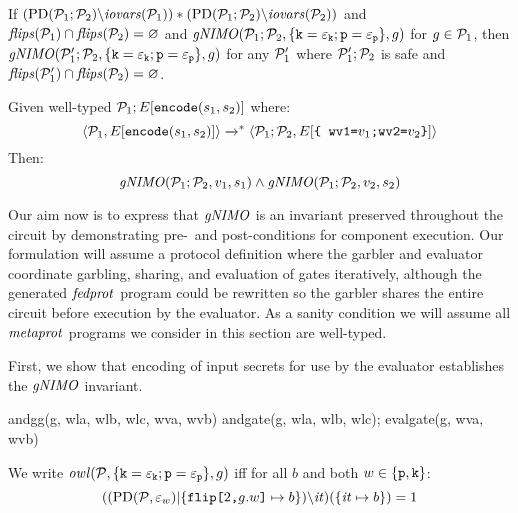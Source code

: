 \begin{lemma}
  \label{lemma-gnimo}
  If $(\mathrm{PD}(\mathcal{P}_1;\mathcal{P}_2)\backslash\mathit{iovars}(\mathcal{P}_1)) * (\mathrm{PD}(\mathcal{P}_1;\mathcal{P}_2)\backslash\mathit{iovars}(\mathcal{P}_2))$
  and $\mathit{flips}(\mathcal{P}_1) \cap \mathit{flips}(\mathcal{P}_2) = \varnothing$ and
  $\mathit{gNIMO}(\mathcal{P}_1;\mathcal{P}_2,\{ \texttt{k} = \varepsilon_{\texttt{k}}; \texttt{p} = \varepsilon_{\texttt{p}}\}, g)$ for
  $g \in \mathcal{P}_1$,
  then $\mathit{gNIMO}(\mathcal{P}_1';\mathcal{P}_2,\{ \texttt{k} = \varepsilon_{\texttt{k}}; \texttt{p} = \varepsilon_{\texttt{p}}\}, g)$
  for any $\mathcal{P}_1'$ where $\mathcal{P}_1';\mathcal{P}_2$ is safe and
  $\mathit{flips}(\mathcal{P}_1') \cap \mathit{flips}(\mathcal{P}_2) = \varnothing$.
\end{lemma}

\begin{lemma}
  Given well-typed $\mathcal{P}_1;E[\texttt{encode}(s_1,s_2)]$ where:
  $$
  \langle \mathcal{P}_1,E[\texttt{encode}(s_1,s_2)] \rangle \xrightarrow{}^{*}
  \langle \mathcal{P}_1;\mathcal{P}_2,E[\texttt{\{ wv1=}v_1\texttt{;wv2=}v_2 \texttt{\}}] \rangle
  $$
  Then:
  $$\mathit{gNIMO}(\mathcal{P}_1;\mathcal{P}_2,v_1,s_1) \wedge \mathit{gNIMO}(\mathcal{P}_1;\mathcal{P}_2,v_2,s_2)$$
\end{lemma}



Our aim now is to express that $\mathit{gNIMO}$ is an invariant preserved throughout
the circuit by demonstrating pre-~and post-conditions for component execution.
Our formulation will assume a protocol definition where the garbler and
evaluator coordinate garbling, sharing, and evaluation of gates iteratively,
although the generated $\mathit{fedprot}$ program could be rewritten so the garbler
shares the entire circuit before execution by the evaluator. As a sanity
condition we will assume all $\mathit{metaprot}$ programs we consider in this
section are well-typed. 

First, we show that encoding of input secrets for use by the evaluator
establishes the $\mathit{gNIMO}$ invariant.

\begin{verbatimtab}
andgg(g, wla, wlb, wlc, wva, wvb) {
andgate(g, wla, wlb, wlc);
evalgate(g, wva, wvb)
}
\end{verbatimtab}


\begin{definition}
  We write $\mathit{owl}(\mathcal{P}, \{ \texttt{k} = \varepsilon_{\texttt{k}}; \texttt{p} = \varepsilon_{\texttt{p}}\}, g)$
 iff for all $b$ and both $w \in \{\texttt{p},\texttt{k}\}$:
  $$
  ((\mathrm{PD}(\mathcal{P},\varepsilon_{w})|\{ \texttt{flip[}2\texttt{,}g.w\texttt{]} \mapsto b \})\backslash\mathit{it})(\{ \mathit{it} \mapsto b\}) = 1
  $$
\end{definition}

